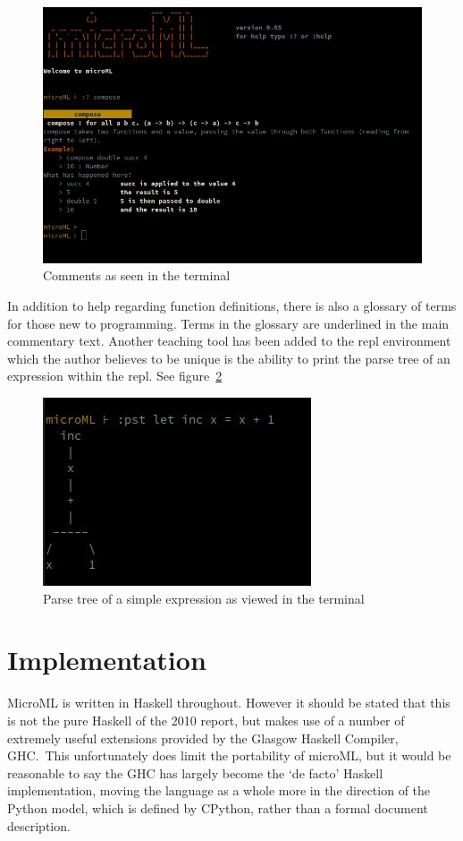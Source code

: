 \documentclass[12pt, a4paper]{report}
\begin{document}
\begin{figure}
    \includegraphics[scale=0.4]{images/comment.jpg}
    {\caption{Comments as seen in the terminal}}
    \label{fig:comments}
\end{figure}

In addition to help regarding function definitions, there is also a glossary of terms for those new
to programming. Terms in the glossary are underlined in the main commentary text.  Another teaching 
tool has been added to the repl environment which the author believes to be unique
is the ability to print the parse tree of an expression within the repl. See figure~\ref{fig:tree}

\begin{figure}
    \includegraphics[scale=0.6]{images/tree.jpg}
    {\caption{Parse tree of a simple expression as viewed in the terminal}}
    \label{fig:tree}
\end{figure}

\section{Implementation}
MicroML is written in Haskell throughout. However it should be stated that this is not the pure
Haskell of the 2010 report, but makes use of a number of extremely useful extensions provided by
the Glasgow Haskell Compiler, GHC.\ This unfortunately does limit the portability of microML, 
but it would be reasonable to say the GHC has largely become the `de facto' Haskell implementation, moving the
language as a whole more in the direction of the Python model, which is defined by CPython, 
rather than a formal document description.
\end{document}

